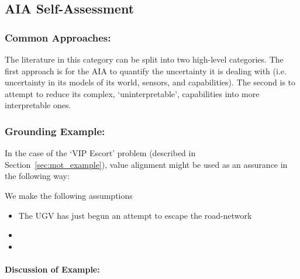 \subsection{AIA Self-Assessment} \label{sec:aia_self_assessment}

\subsubsection{Common Approaches:}
The literature in this category can be split into two high-level categories. The first approach is for the AIA to quantify the uncertainty it is dealing with (i.e. uncertainty in its models of its world, sensors, and capabilities). The second is to attempt to reduce its complex, `uninterpretable', capabilities into more interpretable ones.




\subsubsection{Grounding Example:}
In the case of the `VIP Escort' problem (described in Section~\ref{sec:mot_example}), value alignment might be used as an assurance in the following way:

We make the following assumptions

\begin{itemize}
    \item The UGV has just begun an attempt to escape the road-network
    \item 
    \item 
\end{itemize}

\paragraph{\textbf{Discussion of Example:}} 
